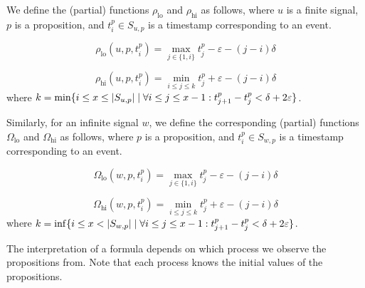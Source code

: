 \documentclass[envcountsame, runningheads]{llncs}
\newcommand{\?}{\text{?}}
\newcommand{\suchthat}{\;\ifnum\currentgrouptype=16 \middle\fi|\;}
\let\st\suchthat
\begin{document}
	We define the (partial) functions $\rho_{\text{lo}}$ and $\rho_{\text{hi}}$ as follows, where $u$ is a finite signal, $p$ is a proposition, and $t^p_i \in S_{u,p}$ is a timestamp corresponding to an event.
	
	$$ \rho_{\text{lo}}(u, p, t^p_i) = \max_{j \in \{1, i\}} t^p_j - \varepsilon - (j-i)\delta $$
	
	$$ \rho_{\text{hi}}(u, p, t^p_i) = \min_{i \leq j \leq k} t^p_j + \varepsilon - (j-i)\delta $$
	where $k = \min \{ i \leq x \leq |S_{u,p}| \st \forall i \leq j \leq x - 1 : t^p_{j + 1} - t^p_j < \delta + 2\varepsilon\}$.
	
	Similarly, for an infinite signal $w$, we define the corresponding (partial) functions $\Omega_{\text{lo}}$ and $\Omega_{\text{hi}}$ as follows, where $p$ is a proposition, and $t^p_i \in S_{w,p}$ is a timestamp corresponding to an event.
	
	$$ \Omega_{\text{lo}}(w, p, t^p_i) = \max_{j \in \{1, i\}} t^p_j - \varepsilon - (j-i)\delta $$
	
	$$ \Omega_{\text{hi}}(w, p, t^p_i) = \min_{i \leq j \leq k} t^p_j + \varepsilon - (j-i)\delta $$
	where $k = \inf \{ i \leq x < |S_{w,p}| \st \forall i \leq j \leq x - 1 : t^p_{j + 1} - t^p_j < \delta + 2\varepsilon\}$.
	
	The interpretation of a formula depends on which process we observe the propositions from.
	Note that each process knows the initial values of the propositions.
	
\end{document}
